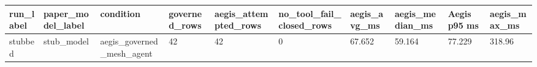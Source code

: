 \begin{tabular}{llllllllll}
 \hline
run\_label & paper\_model\_label & condition & governed\_rows & aegis\_attempted\_rows & no\_tool\_fail\_closed\_rows & aegis\_avg\_ms & aegis\_median\_ms & Aegis p95 ms & aegis\_max\_ms \\
 \hline
stubbed & stub\_model & aegis\_governed\_mesh\_agent & 42 & 42 & 0 & 67.652 & 59.164 & 77.229 & 318.96 \\
 \hline
\end{tabular}

